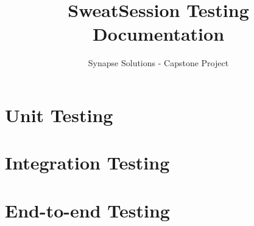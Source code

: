 \documentclass[12pt, letterpaper]{article}
\title{SweatSession Testing Documentation}
\author{Synapse Solutions - Capstone Project}
\begin{document}
\maketitle
\section*{Unit Testing}
\section*{Integration Testing}
\section*{End-to-end Testing}
    
\end{document}
